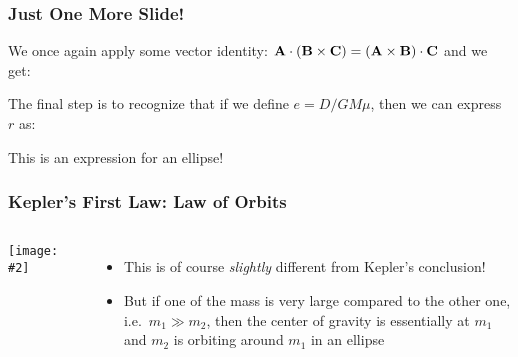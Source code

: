 \documentclass[12pt,compress,aspectratio=169]{beamer}
\newcommand{\pic}[2]{\texttt{[image: \#2]}}
\newcommand{\mb}[1]{\ensuremath\mathbf{#1}}
\begin{document}
\begin{frame}
  \frametitle{Just One More Slide!}
  We once again apply some vector identity:
  $\mb{A}\cdot(\mb{B}\times\mb{C})=(\mb{A}\times\mb{B})\cdot\mb{C}$ and we
  get:

  \vspace{-0.3in}{\Large
    \begin{displaymath}
      \left(\mb{r}\times\mb{v}\right)\cdot\mb{L}
      =GM\mu r + rD\cos\theta
    \end{displaymath}
  }

  \vspace{-.2in}
  The final step is to recognize that if we define $e=D/GM\mu$, then we can 
  express $r$ as:
  
  
  This is an expression for an ellipse!
    
\end{frame}


\begin{frame}
  \frametitle{Kepler's First Law: Law of Orbits}
  \begin{columns}
    \vspace{0.2in}
    \pic{1.2}{kepo17.png}
    \begin{center}
    \end{center}
    \begin{itemize}
    \item This is of course \emph{slightly} different from Kepler's conclusion!
    \item But if one of the mass is very large compared to the other one,
      i.e.\ $m_1\gg m_2$, then the center of gravity is essentially at $m_1$
      and $m_2$ is orbiting around $m_1$ in an ellipse
    \end{itemize}
  \end{columns}
\end{frame}
\end{document}
